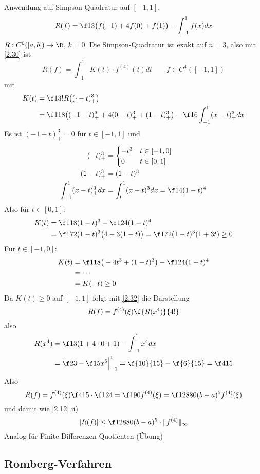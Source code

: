 \documentclass[11pt]{scrartcl}
\begin{document}
\begin{ex*}
	Anwendung auf Simpson-Quadratur auf $[-1,1]$.
	\[
		R(f) = \f 13 \big(f(-1) + 4f(0) + f(1)\big) -\int_{-1}^1 f(x) dx
	\]
	$R: C^0 ([a,b]) \to \R$, $k=0$.
	Die Simpson-Quadratur ist exakt auf $n=3$, also mit \ref{2.30} ist
	\[
		R(f) = \int_{-1}^1 K(t) \cdot f^{(4)}(t) dt \qquad f\in C^4([-1,1])
	\]
	mit
	\begin{align*}
		K(t) &= \f 1{3!}R \big((\cdot - t)_+^3\big) \\
		&= \f 1{18} \big((-1-t)_+^3+ 4(0-t)_+^3 + (1-t)_+^3 \big) - \f 16 \int_{-1}^1 (x-t)_+^3 dx \\
	\end{align*}
	Es ist $(-1-t)_+^3 = 0$ für $t\in [-1,1]$ und
	\begin{align*}
		(-t)_+^3 &= \begin{cases}
			-t^3 & t\in[-1,0] \\
			0 & t\in[0,1]
		\end{cases} \\
		(1-t)_+^3 &= (1-t)^3 \\
		\int_{-1}^1 (x-t)_+^3 dx &= \int_t^1 (x-t)^3 dx = \f 14(1-t)^4
	\end{align*}
	Also für $t\in [0,1]$:
	\begin{align*}
		K(t) &= \f 1{18} (1-t)^3 - \f 1{24} (1-t)^4 \\
			&= \f 1{72}(1-t)^3\big(4-3(1-t)\big) = \f 1{72}(1-t)^3(1+3t) \ge 0
	\end{align*}
	Für $t\in [-1,0]$:
	\begin{align*}
		K(t) &= \f 1{18}\big(-4t^3 + (1-t)^3\big) - \f 1{24}(1-t)^4 \\
		&=  \dotsb \\
		&= K(-t) \ge 0
	\end{align*}
	Da $K(t) \ge 0$ auf $[-1,1]$ folgt mit \ref{2.32} die Darstellung
	\[
		R(f) = f^{(4)}(\xi) \f {R(x^4)}{4!}
	\]
	also
	\begin{align*}
		R(x^4) &= \f 13 (1+4\cdot 0 + 1) - \int_{-1}^1 x^4 dx \\
		&= \f 23 - \f 15 x^5 \Big|_{-1}^1
		= \f {10}{15} - \f {6}{15} = \f 4{15}
	\end{align*}
	Also
	\[
		R(f) = f^{(4)}(\xi) \f 4{15} \cdot \f 1{24} 
		= \f 1{90} f^{(4)}(\xi) 
		= \f 1{2880} (b-a)^5 f^{(4)}(\xi)
	\]
	und damit wie \ref{2.12} ii)
	\[
		|R(f)| \le \f 1{2880} (b-a)^5 \cdot \|f^{(4)}\|_\infty
	\]
	Analog für Finite-Differenzen-Quotienten (Übung)
\end{ex*}


\subsection{Romberg-Verfahren}
\end{document}
